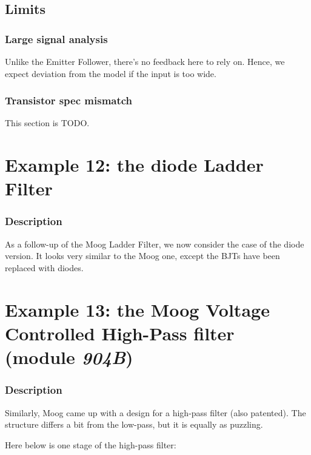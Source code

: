 \documentclass[10pt]{article}
\begin{document}
 
\subsection*{Limits}


\subsubsection*{Large signal analysis}
Unlike the Emitter Follower, there's no feedback here to rely on. Hence, we expect deviation from the model if the input is too wide.

\subsubsection*{Transistor spec mismatch}
This section is TODO.



\section*{Example 12: the diode Ladder Filter}

\subsubsection*{Description}
As a follow-up of the Moog Ladder Filter, we now consider the case of the diode version. It looks very similar to the Moog one, except the BJTs have been replaced with diodes. 



\section*{Example 13: the Moog Voltage Controlled High-Pass filter (module \textit{904B})}

\subsubsection*{Description}
Similarly, Moog came up with a design for a high-pass filter (also patented). The structure differs a bit from the low-pass, but it is equally as puzzling.

Here below is one stage of the high-pass filter:
\end{document}
